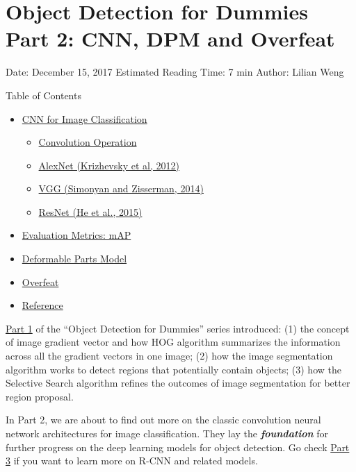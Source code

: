 \section{Object Detection for Dummies Part 2: CNN, DPM and Overfeat}\label{object-detection-for-dummies-part-2-cnn-dpm-and-overfeat}

Date: December 15, 2017 \textbar{} Estimated Reading Time: 7 min \textbar{} Author: Lilian Weng

{Table of Contents}

\begin{itemize}
\tightlist
\item
  \hyperref[cnn-for-image-classification]{CNN for Image Classification}

  \begin{itemize}
  \tightlist
  \item
    \hyperref[convolution-operation]{Convolution Operation}
  \item
    \hyperref[alexnet-krizhevsky-et-al-2012]{AlexNet (Krizhevsky et al, 2012)}
  \item
    \hyperref[vgg-simonyan-and-zisserman-2014]{VGG (Simonyan and Zisserman, 2014)}
  \item
    \hyperref[resnet-he-et-al-2015]{ResNet (He et al., 2015)}
  \end{itemize}
\item
  \hyperref[evaluation-metrics-map]{Evaluation Metrics: mAP}
\item
  \hyperref[deformable-parts-model]{Deformable Parts Model}
\item
  \hyperref[overfeat]{Overfeat}
\item
  \hyperref[reference]{Reference}
\end{itemize}

\href{https://lilianweng.github.io/posts/2017-10-29-object-recognition-part-1/}{Part 1} of the ``Object Detection for Dummies'' series introduced: (1) the concept of image gradient vector and how HOG algorithm summarizes the information across all the gradient vectors in one image; (2) how the image segmentation algorithm works to detect regions that potentially contain objects; (3) how the Selective Search algorithm refines the outcomes of image segmentation for better region proposal.

In Part 2, we are about to find out more on the classic convolution neural network architectures for image classification. They lay the \emph{\textbf{foundation}} for further progress on the deep learning models for object detection. Go check \href{https://lilianweng.github.io/posts/2017-12-31-object-recognition-part-3/}{Part 3} if you want to learn more on R-CNN and related models.

